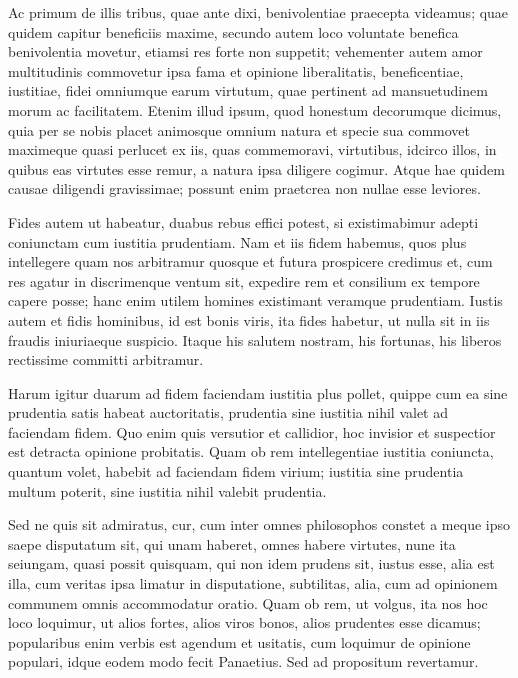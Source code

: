  Ac primum de illis tribus, quae ante dixi, benivolentiae praecepta videamus; quae quidem capitur beneficiis maxime, secundo autem loco voluntate benefica benivolentia movetur, etiamsi res forte non suppetit; vehementer autem amor multitudinis commovetur ipsa fama et opinione liberalitatis, beneficentiae, iustitiae, fidei omniumque earum virtutum, quae pertinent ad mansuetudinem morum ac facilitatem. Etenim illud ipsum, quod honestum decorumque dicimus, quia per se nobis placet animosque omnium natura et specie sua commovet maximeque quasi perlucet ex iis, quas commemoravi, virtutibus, idcirco illos, in quibus eas virtutes esse remur, a natura ipsa diligere cogimur. Atque hae quidem causae diligendi gravissimae; possunt enim praetcrea non nullae esse leviores.

 Fides autem ut habeatur, duabus rebus effici potest, si existimabimur adepti coniunctam cum iustitia prudentiam. Nam et iis fidem habemus, quos plus intellegere quam nos arbitramur quosque et futura prospicere credimus et, cum res agatur in discrimenque ventum sit, expedire rem et consilium ex tempore capere posse; hanc enim utilem homines existimant veramque prudentiam. Iustis autem et fidis hominibus, id est bonis viris, ita fides habetur, ut nulla sit in iis fraudis iniuriaeque suspicio. Itaque his salutem nostram, his fortunas, his liberos rectissime committi arbitramur.

 Harum igitur duarum ad fidem faciendam iustitia plus pollet, quippe cum ea sine prudentia satis habeat auctoritatis, prudentia sine iustitia nihil valet ad faciendam fidem. Quo enim quis versutior et callidior, hoc invisior et suspectior est detracta opinione probitatis. Quam ob rem intellegentiae iustitia coniuncta, quantum volet, habebit ad faciendam fidem virium; iustitia sine prudentia multum poterit, sine iustitia nihil valebit prudentia.

 Sed ne quis sit admiratus, cur, cum inter omnes philosophos constet a meque ipso saepe disputatum sit, qui unam haberet, omnes habere virtutes, nune ita seiungam, quasi possit quisquam, qui non idem prudens sit, iustus esse, alia est illa, cum veritas ipsa limatur in disputatione, subtilitas, alia, cum ad opinionem communem omnis accommodatur oratio. Quam ob rem, ut volgus, ita nos hoc loco loquimur, ut alios fortes, alios viros bonos, alios prudentes esse dicamus; popularibus enim verbis est agendum et usitatis, cum loquimur de opinione populari, idque eodem modo fecit Panaetius. Sed ad propositum revertamur.

